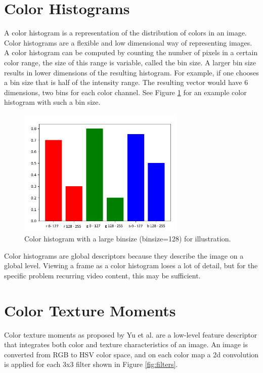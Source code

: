 \documentclass{report}
\begin{document}
\section{Color Histograms}
A color histogram is a representation of the distribution of colors in an image. Color histograms are a flexible and low dimensional way of representing images. A color histogram can be computed by counting the number of pixels in a certain color range, the size of this range is variable, called the bin size. A larger bin size results in lower dimensions of the resulting histogram. For example, if one chooses a bin size that is half of the intensity range. The resulting vector would have 6 dimensions, two bins for each color channel. See Figure \ref{fig:colorhistogram} for an example color histogram with such a bin size.
\begin{figure}[H]
	\includegraphics[width=8cm]{images/colorhistogram.png}
	\centering
	\caption{Color histogram with a large binsize (binsize=128) for illustration.}
	\label{fig:colorhistogram}
\end{figure}
Color histograms are global descriptors because they describe the image on a global level. Viewing a frame as a color histogram loses a lot of detail, but for the specific problem recurring video content, this may be sufficient.

\section{Color Texture Moments}
Color texture moments as proposed by Yu et al. \cite{yu2002colortexturemoments} are a low-level feature descriptor that integrates both color and texture characteristics of an image. An image is converted from RGB to HSV color space, and on each color map a 2d convolution is applied for each 3x3 filter shown in Figure \ref{fig:filters}.
\end{document}
